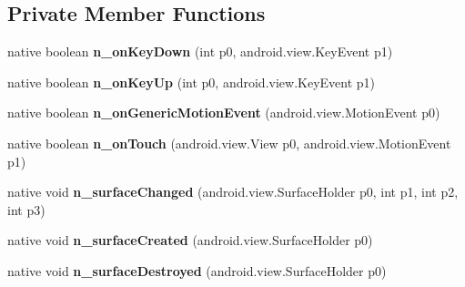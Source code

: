 \subsection*{Private Member Functions}
\begin{DoxyCompactItemize}
\item 
\mbox{\label{classmd59e336b20c5f59a4196ec0611a339f132_1_1MonoGameAndroidGameView_acf9dbdec3dc35e8dae1a4b10e4a590a1}} 
native boolean {\bfseries n\+\_\+on\+Key\+Down} (int p0, android.\+view.\+Key\+Event p1)
\item 
\mbox{\label{classmd59e336b20c5f59a4196ec0611a339f132_1_1MonoGameAndroidGameView_a04adef70a9484e7b442703fd54a07b56}} 
native boolean {\bfseries n\+\_\+on\+Key\+Up} (int p0, android.\+view.\+Key\+Event p1)
\item 
\mbox{\label{classmd59e336b20c5f59a4196ec0611a339f132_1_1MonoGameAndroidGameView_ab7e82b41e312851cbdb50a9cb69e5139}} 
native boolean {\bfseries n\+\_\+on\+Generic\+Motion\+Event} (android.\+view.\+Motion\+Event p0)
\item 
\mbox{\label{classmd59e336b20c5f59a4196ec0611a339f132_1_1MonoGameAndroidGameView_a068976f6469a0187e495c66f6135a206}} 
native boolean {\bfseries n\+\_\+on\+Touch} (android.\+view.\+View p0, android.\+view.\+Motion\+Event p1)
\item 
\mbox{\label{classmd59e336b20c5f59a4196ec0611a339f132_1_1MonoGameAndroidGameView_ad92f9b3addceab6e5072bf8325387db8}} 
native void {\bfseries n\+\_\+surface\+Changed} (android.\+view.\+Surface\+Holder p0, int p1, int p2, int p3)
\item 
\mbox{\label{classmd59e336b20c5f59a4196ec0611a339f132_1_1MonoGameAndroidGameView_aef0076423271811723f3756e1e548cde}} 
native void {\bfseries n\+\_\+surface\+Created} (android.\+view.\+Surface\+Holder p0)
\item 
\mbox{\label{classmd59e336b20c5f59a4196ec0611a339f132_1_1MonoGameAndroidGameView_a8df9a8c5f9a610facaa7d08efcc51590}} 
native void {\bfseries n\+\_\+surface\+Destroyed} (android.\+view.\+Surface\+Holder p0)
\end{DoxyCompactItemize}
